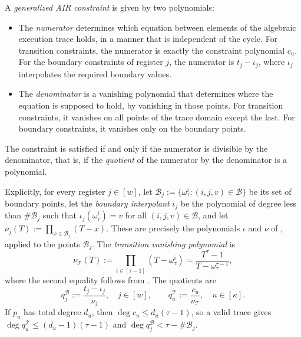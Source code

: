 \documentclass[../../book]{subfiles}
\begin{document}
\begin{definition}\label{def:gen-air}
  A \emph{generalized AIR constraint} is given by two polynomials:
  \begin{itemize}
    \item The \emph{numerator} determines which equation between elements of the algebraic execution trace holds, in a manner that is independent of the cycle.
    For transition constraints, the numerator is exactly the constraint polynomial $c_u$.
    For the boundary constraints of register $j$, the numerator is $t_j - \iota_j$, where $\iota_j$ interpolates the required boundary values.
    \item The \emph{denominator} is a vanishing polynomial that determines where the equation is supposed to hold, by vanishing in those points.
    For transition constraints, it vanishes on all points of the trace domain except the last.
    For boundary constraints, it vanishes only on the boundary points.
  \end{itemize}
  The constraint is satisfied if and only if the numerator is divisible by the denominator, that is, if the \emph{quotient} of the numerator by the denominator is a polynomial.
\end{definition}

Explicitly, for every register $j \in [w]$, let $\mathcal{B}_j := \{\omega_\tau^i : (i, j, v) \in \mathcal{B}\}$ be its set of boundary points, let the \emph{boundary interpolant} $\iota_j$ be the polynomial of degree less than $\#\mathcal{B}_j$ such that $\iota_j(\omega_\tau^i) = v$ for all $(i, j, v) \in \mathcal{B}$, and let $\nu_j(T) := \prod_{x \in \mathcal{B}_j} (T - x)$.
These are precisely the polynomials $\iota$ and $\nu$ of , applied to the points $\mathcal{B}_j$.
The \emph{transition vanishing polynomial} is
\begin{equation*}
  \nu_{\mathcal{T}}(T) := \prod_{i \in [\tau - 1]} (T - \omega_\tau^i) = \frac{T^\tau - 1}{T - \omega_\tau^{\tau - 1}},
\end{equation*}
where the second equality follows from .
The quotients are
\begin{equation*}
  q^{\mathcal{B}}_j := \frac{t_j - \iota_j}{\nu_j}, \quad j \in [w], \qquad q^{\mathcal{T}}_u := \frac{c_u}{\nu_{\mathcal{T}}}, \quad u \in [\kappa].
\end{equation*}
If $p_u$ has total degree $d_u$, then $\deg c_u \leq d_u (\tau - 1)$, so a valid trace gives $\deg q^{\mathcal{T}}_u \leq (d_u - 1)(\tau - 1)$ and $\deg q^{\mathcal{B}}_j < \tau - \#\mathcal{B}_j$.
\end{document}
